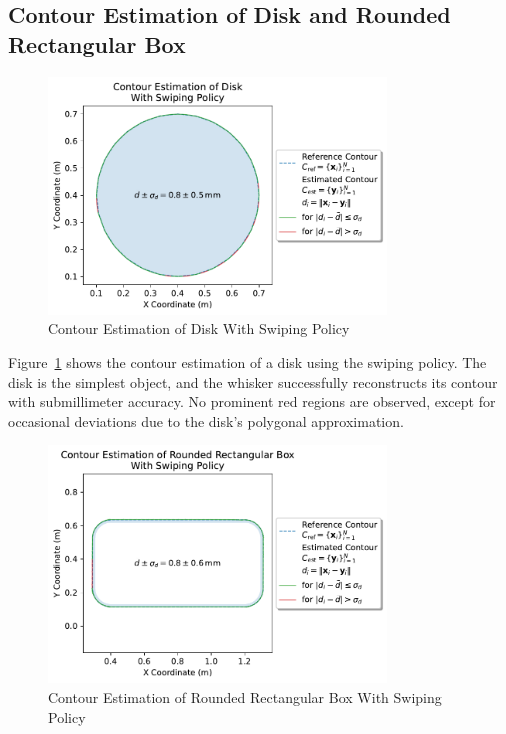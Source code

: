 \subsection{Contour Estimation of Disk and Rounded Rectangular Box}

\begin{figure}[htb]
    \centering
    \includegraphics[width=0.8\textwidth]{figures/experiments/disk-swiping}
    \caption{Contour Estimation of Disk With Swiping Policy}
    \label{fig:experiment-disk-swiping}
\end{figure}

Figure~\ref{fig:experiment-disk-swiping} shows the contour estimation of a disk using the swiping policy.
The disk is the simplest object, and the whisker successfully reconstructs its contour with submillimeter accuracy.
No prominent red regions are observed, except for occasional deviations due to the disk's polygonal approximation.

\begin{figure}[htb]
    \centering
    \includegraphics[width=0.8\textwidth]{figures/experiments/rounded-rectangular-box-swiping}
    \caption{Contour Estimation of Rounded Rectangular Box With Swiping Policy}
    \label{fig:experiment-rounded-rectangular-box-swiping}
\end{figure}

